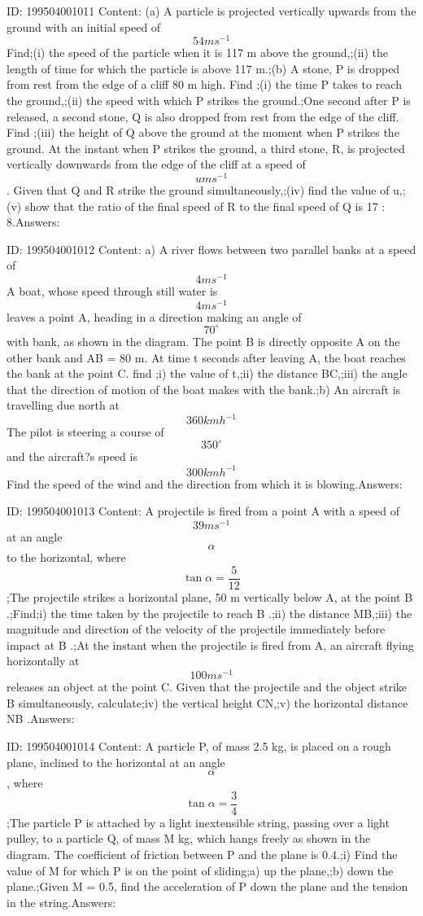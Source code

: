 \documentclass{article}
\begin{document}
ID: 199504001011
Content:
(a)	    A particle is projected vertically upwards from the ground with an initial speed of \[54ms^{-1}\] Find;(i)	the speed of the particle when it is 117 m above the ground,;(ii)	the length of time for which the particle is above 117 m.;(b)	A stone, P is dropped from rest from the edge of a cliff 80 m high. Find ;(i)	the time P takes to reach the ground,;(ii)	the speed with which P strikes the ground.;One second after P is released, a second stone, Q is also dropped from rest from the edge of the cliff. Find ;(iii)	the height of Q above the ground at the moment when P strikes the ground. At the instant when P strikes the ground, a third stone, R, is projected vertically downwards from the edge of the cliff at a speed of \[u ms^{-1}\]. Given that Q and R strike the ground simultaneously,;(iv)	find the value of u,;(v)	show that the ratio of the final speed of R to the final speed of Q is 17 : 8.Answers:

ID: 199504001012
Content:
a) A river flows between two parallel banks at a speed of \[4ms^{-1}\] A boat, whose speed through still water is \[4ms^{-1}\] leaves a point A, heading in a direction making an angle of \[70^{\circ}\] with bank, as shown in the diagram. The point B is directly opposite A on the other bank and AB = 80 m. At time t seconds after leaving A, the boat reaches the bank at the point C. find ;i) the value of t,;ii) the distance BC,;iii) the angle that the direction of motion of the boat makes with the bank.;b) An aircraft is travelling due north at \[360kmh^{-1}\]  The pilot is steering a course of \[350^{\circ}\] and the aircraft?s speed is \[300kmh^{-1}\]  Find the speed of the wind and the direction from which it is blowing.Answers:

ID: 199504001013
Content:
A projectile is fired from a point A with a speed of \[39ms^{-1}\] at an angle \[\alpha\] to the horizontal, where \[\tan \alpha=\frac{5}{12}\] ;The projectile strikes a horizontal plane, 50 m vertically below A, at the point B .;Find;i) the time taken by the projectile to reach B .;ii) the distance MB,;iii) the magnitude and direction of the velocity of the projectile immediately before impact at B .;At the instant when the projectile is fired from A, an aircraft flying horizontally at \[100ms^{-1}\] releases an object at the point C. Given that the projectile and the object strike B simultaneously, calculate;iv) the vertical height CN,;v) the horizontal distance NB .Answers:

ID: 199504001014
Content:
A particle P, of mass 2.5 kg, is placed on a rough plane, inclined to the horizontal at an angle \[\alpha\], where \[\tan \alpha=\frac{3}{4}\] ;The particle P is attached by a light inextensible string, passing over a light pulley, to a particle Q, of mass M kg, which hangs freely as shown in the diagram. The coefficient of friction between P and the plane is 0.4.;i) Find the value of M for which P is on the point of sliding;a) up the plane,;b) down the plane.;Given M = 0.5, find the acceleration of P down the plane and the tension in the string.Answers:
\end{document}
